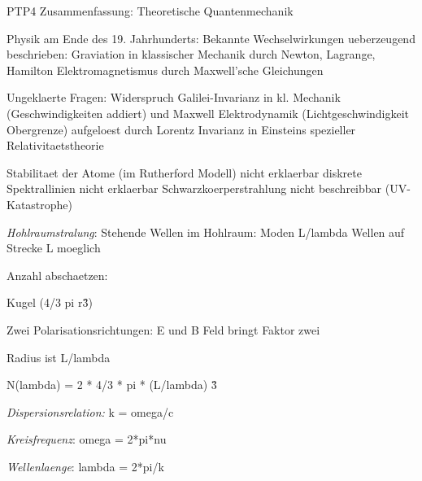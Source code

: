 \documentclass{article}
\begin{document}
\begin{center}
\large
PTP4 Zusammenfassung: Theoretische Quantenmechanik
\end{center}


Physik am Ende des 19. Jahrhunderts: 
Bekannte Wechselwirkungen ueberzeugend beschrieben: 
Graviation in klassischer Mechanik durch Newton, Lagrange, Hamilton
Elektromagnetismus durch Maxwell'sche Gleichungen

Ungeklaerte Fragen: 
Widerspruch Galilei-Invarianz in kl. Mechanik (Geschwindigkeiten addiert) und Maxwell Elektrodynamik (Lichtgeschwindigkeit Obergrenze) aufgeloest durch Lorentz Invarianz in Einsteins spezieller Relativitaetstheorie

Stabilitaet der Atome (im Rutherford Modell) nicht erklaerbar
diskrete Spektrallinien nicht erklaerbar
Schwarzkoerperstrahlung nicht beschreibbar (UV-Katastrophe)

\emph{Hohlraumstralung}: 
Stehende Wellen im Hohlraum: Moden
L/lambda Wellen auf Strecke L moeglich


Anzahl abschaetzen:


Kugel (4/3 pi r\^3)


Zwei Polarisationsrichtungen: E und B Feld bringt Faktor zwei


Radius ist L/lambda 


N(lambda)  = 2 * 4/3 * pi * (L/lambda) \^3


\emph{Dispersionsrelation:} k = omega/c


\emph{Kreisfrequenz}: omega = 2*pi*nu


\emph{Wellenlaenge}: lambda = 2*pi/k
\end{document}
